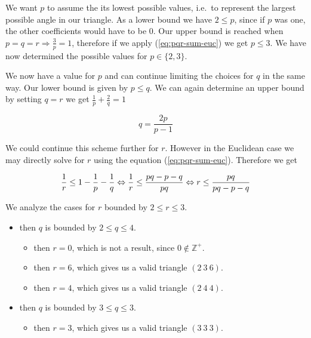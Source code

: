 We want \(p\) to assume the its lowest possible values, i.e.~to
represent the largest possible angle in our triangle. As a lower bound
we have \(2 \le p\), since if \(p\) was one, the other coefficients
would have to be 0. Our upper bound is reached when \(p = q = r \Rightarrow \frac{3}{p} = 1\),
therefore if we apply (\ref{eq:pqr-sum-euc}) we get \(p \le 3\). We have now determined the possible values for \(p \in \{ 2, 3 \}\).


We now have a value for \(p\) and can continue limiting the choices for \(q\) in the same way. Our lower bound is given by \(p \le q\). 
We can again determine an upper bound by setting \(q = r\) we get \(\frac{1}{p} + \frac{2}{q} = 1\)


\[
q = \frac{2p}{p-1}
\]

We could continue this scheme further for \(r\). However in the Euclidean case we may directly solve for \(r\) using the equation (\ref{eq:pqr-sum-euc}). Therefore we get

\[
\frac{1}{r} \le 1 - \frac{1}{p} - \frac{1}{q} \\ \Leftrightarrow
\frac{1}{r} \le \frac{pq - p - q}{pq} \\ \Leftrightarrow
r \le \frac{pq}{pq-p-q} \\
\]

\pagebreak

We analyze the cases for $r$ bounded by $2 \le r \le 3$.
\begin{itemize}
\item[If \(r = 2\)] then \(q\) is bounded by \(2 \le q \le 4\).
  \begin{itemize}
    \item[If \(q = 2\)] then \(r = 0\), which is not a result, since $0 \not\in \mathbb{Z}^+$.
    \item[If \(q = 3\)] then \(r = 6\), which gives us a valid triangle \((2~3~6)\). \checkmark
    \item[If \(q = 4\)] then \(r = 4\), which gives us a valid triangle \((2~4~4)\). \checkmark
  \end{itemize}
\item[If \(r = 3\)] then \(q\) is bounded by \(3 \le q \le 3\).
  \begin{itemize}
    \item[If \(q = 3\)] then \(r = 3\), which gives us a valid triangle \((3~3~3)\). \checkmark
  \end{itemize}
\end{itemize}


